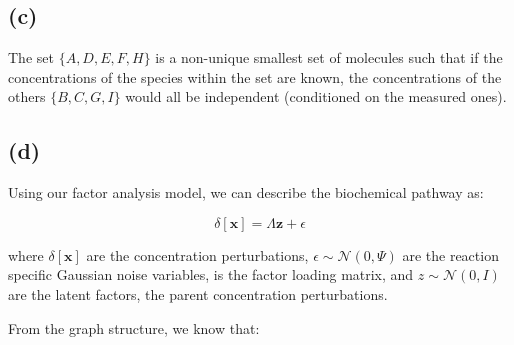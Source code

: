 \documentclass[12pt]{article}
\begin{document}
\subsection*{(c)}

\begin{center}
\end{center}


The set $\{A, D, E, F, H\}$ is a non-unique smallest set of molecules such that if the concentrations of the species within the set are known, the concentrations of the others $\{B, C, G, I\}$ would all be independent (conditioned on the measured ones).


\subsection*{(d)}

Using our factor analysis model, we can describe the biochemical pathway as:

\[\delta[\textbf{x}] = \Lambda \textbf{z} + \epsilon\]

where $\delta[\textbf{x}]$ are the concentration perturbations, $\epsilon \sim \mathcal{N} (0, \Psi)$ are the reaction specific Gaussian noise variables, \Lambda is the factor loading matrix, and $z \sim \mathcal{N} (0, I)$ are the latent factors, the parent concentration perturbations.

From the graph structure, we know that:
\end{document}
